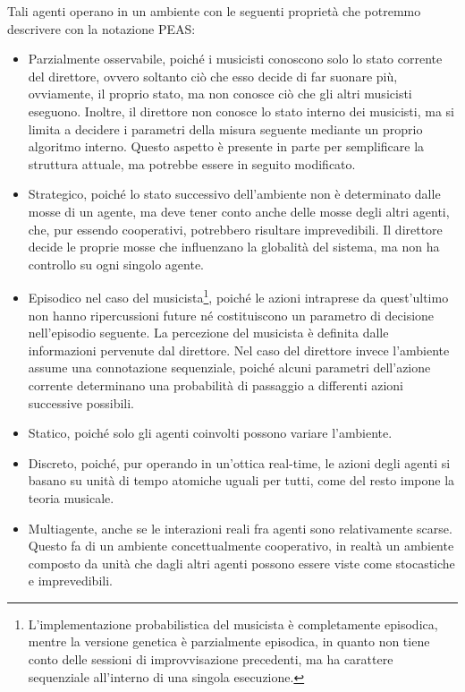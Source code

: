 Tali agenti operano in un ambiente con le seguenti proprietà che potremmo descrivere con la notazione PEAS:
\begin{itemize}
 \item Parzialmente osservabile, poiché i musicisti conoscono solo lo stato corrente del direttore, ovvero soltanto ciò che esso decide di far suonare più, ovviamente, il proprio stato, ma non conosce ciò che gli altri musicisti eseguono.
 Inoltre, il direttore non conosce lo stato interno dei musicisti, ma si limita a decidere i parametri della misura seguente mediante un proprio algoritmo interno.
 Questo aspetto è presente in parte per semplificare la struttura attuale, ma potrebbe essere in seguito modificato.
 \item Strategico, poiché lo stato successivo dell'ambiente non è determinato dalle mosse di un agente, ma deve tener conto anche delle mosse degli altri agenti, che, pur essendo cooperativi, potrebbero risultare imprevedibili.
 Il direttore decide le proprie mosse che influenzano la globalità del sistema, ma non ha controllo su ogni singolo agente.
 \item Episodico nel caso del musicista\footnote{L'implementazione probabilistica del musicista è completamente episodica, mentre la versione genetica è parzialmente episodica, in quanto non tiene conto delle sessioni di improvvisazione precedenti, ma ha carattere sequenziale all'interno di una singola esecuzione.}, poiché le azioni intraprese da quest'ultimo non hanno ripercussioni future né costituiscono un parametro di decisione nell'episodio seguente.
 La percezione del musicista è definita dalle informazioni pervenute dal direttore.
 Nel caso del direttore invece l'ambiente assume una connotazione sequenziale, poiché alcuni parametri dell'azione corrente determinano una probabilità di passaggio a differenti azioni successive possibili.
 \item Statico, poiché solo gli agenti coinvolti possono variare l'ambiente.
 \item Discreto, poiché, pur operando in un'ottica real-time, le azioni degli agenti si basano su unità di tempo atomiche uguali per tutti, come del resto impone la teoria musicale.
 \item Multiagente, anche se le interazioni reali fra agenti sono relativamente scarse. Questo fa di un ambiente concettualmente cooperativo, in realtà un ambiente composto da unità che dagli altri agenti possono essere viste come stocastiche e imprevedibili.
 \end{itemize}

